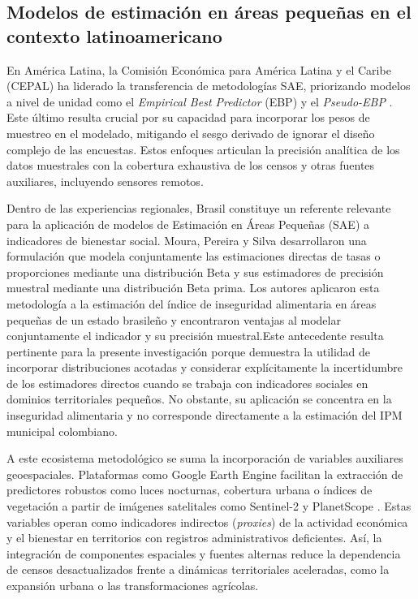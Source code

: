    
\subsection{Modelos de estimación en áreas pequeñas en el contexto latinoamericano}
        En América Latina, la Comisión Económica para América Latina y el Caribe (CEPAL) ha liderado la transferencia de metodologías SAE, priorizando modelos a nivel de unidad como el \textit{Empirical Best Predictor} (EBP) y el \textit{Pseudo-EBP} \cite{cepal2024}. Este último resulta crucial por su capacidad para incorporar los pesos de muestreo en el modelado, mitigando el sesgo derivado de ignorar el diseño complejo de las encuestas. Estos enfoques articulan la precisión analítica de los datos muestrales con la cobertura exhaustiva de los censos y otras fuentes auxiliares, incluyendo sensores remotos.
        
        Dentro de las experiencias regionales, Brasil constituye un referente relevante para la aplicación de modelos de Estimación en Áreas Pequeñas (SAE) a indicadores de bienestar social. Moura, Pereira y Silva \cite{moura2021} desarrollaron una formulación que modela conjuntamente las estimaciones directas de tasas o proporciones mediante una distribución Beta y sus estimadores de precisión muestral mediante una distribución Beta prima. Los autores aplicaron esta metodología a la estimación del índice de inseguridad alimentaria en áreas pequeñas de un estado brasileño y encontraron ventajas al modelar conjuntamente el indicador y su precisión muestral.Este antecedente resulta pertinente para la presente investigación porque demuestra la utilidad de incorporar distribuciones acotadas y considerar explícitamente la incertidumbre de los estimadores directos cuando se trabaja con indicadores sociales en dominios territoriales pequeños. No obstante, su aplicación se concentra en la inseguridad alimentaria y no corresponde directamente a la estimación del IPM municipal colombiano.
        
        A este ecosistema metodológico se suma la incorporación de variables auxiliares geoespaciales. Plataformas como Google Earth Engine facilitan la extracción de predictores robustos como luces nocturnas, cobertura urbana o índices de vegetación a partir de imágenes satelitales como Sentinel-2 y PlanetScope \cite{cepal2024, dane2024}. Estas variables operan como indicadores indirectos (\textit{proxies}) de la actividad económica y el bienestar en territorios con registros administrativos deficientes. Así, la integración de componentes espaciales y fuentes alternas reduce la dependencia de censos desactualizados frente a dinámicas territoriales aceleradas, como la expansión urbana o las transformaciones agrícolas.
    
